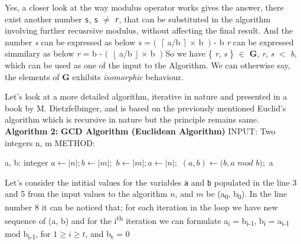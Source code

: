 \documentclass[12pt]{article}
\begin{document}
Yes, a closer look at the way modulus operator works gives the answer, there exist another  number \texttt{s}, \texttt{s} $\neq$ \texttt{r}, that can be substituted in the algorithm involving further recusrsive modulus, without affecting the final result. And the number \textit{s} can be expressed as below
\newline \vspace{0mm} \hspace{4cm} \textit{s} = $ (\ $ $\lceil$ a/b $\rceil$  $\times $ b $\ )$ - b
\newline \textit{r} can be expressed simmilary as below
\newline \vspace{0mm} \hspace{4cm}\textit{r} = b - $ (\ $ $\lfloor$ a/b $\rfloor$  $\times $ b $\ )$
\newline So we have \{ \textit{r}, \textit{s} \} $\in$ \textbf{G}, \textit{r}, \textit{s} $<$ \textit{b}, which can be used as one of the input to the Algorithm. 
\newline We can otherwise say, the elements of \textbf{G} exhibits \textit{isomorphic }  behaviour.

Let's look at a more detailed algorithm, iterative in nature and presented in a book by M. Dietzfelbinger, and is based on the previously mentioned Euclid's algorithm which is recursive in nature but the principle remains same.
\newline
\newline \textbf{Algorithm 2:}
\newline \textbf{GCD Algorithm (Euclidean Algorithm)}
\newline INPUT: Two integers n, m
\newline METHOD:


\begin{algorithmic}[1]
\STATE a, b: integer
	\STATE $a \gets |n|; b \gets |m|;$
\ELSE
	\STATE $b \gets |m|; a \gets |n|;$
\ENDIF
{} 
	\STATE $(a, b) \leftarrow (b, a  $ $mod $ $b);$
\ENDWHILE
\RETURN a
\end {algorithmic}

Let's consider the intitial values for the variables \texttt{a} and \texttt{b} populated in the line 3 and 5 from the input values to the algorithm $n$, and $m$ be (a\textsubscript{0}, b\textsubscript{0}). In the line number 8 it can be noticed that; for each iteration in the loop we have new sequence of (a, b) and for the i\textsuperscript{th} iteration we can formulate a\textsubscript{i} = b\textsubscript{i-1}, b\textsubscript{i} = a\textsubscript{i-1} mod b\textsubscript{i-1}, for $1 \geq i \geq t$, and b\textsubscript{t} = 0
\end{document}
